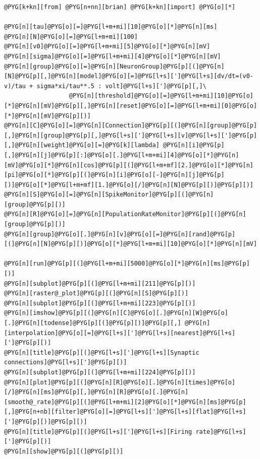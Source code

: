 \documentclass[letterpaper,10pt,english]{manual}
\begin{document}
\begin{Verbatim}[commandchars=@\[\]]
@PYG[k+kn][from] @PYG[n+nn][brian] @PYG[k+kn][import] @PYG[o][*]

@PYG[n][tau]@PYG[o][=]@PYG[l+m+mi][10]@PYG[o][*]@PYG[n][ms]
@PYG[n][N]@PYG[o][=]@PYG[l+m+mi][100]
@PYG[n][v0]@PYG[o][=]@PYG[l+m+mi][5]@PYG[o][*]@PYG[n][mV]
@PYG[n][sigma]@PYG[o][=]@PYG[l+m+mi][4]@PYG[o][*]@PYG[n][mV]
@PYG[n][group]@PYG[o][=]@PYG[n][NeuronGroup]@PYG[p][(]@PYG[n][N]@PYG[p][,]@PYG[n][model]@PYG[o][=]@PYG[l+s][']@PYG[l+s][dv/dt=(v0-v)/tau + sigma*xi/tau**.5 : volt]@PYG[l+s][']@PYG[p][,]\
                  @PYG[n][threshold]@PYG[o][=]@PYG[l+m+mi][10]@PYG[o][*]@PYG[n][mV]@PYG[p][,]@PYG[n][reset]@PYG[o][=]@PYG[l+m+mi][0]@PYG[o][*]@PYG[n][mV]@PYG[p][)]
@PYG[n][C]@PYG[o][=]@PYG[n][Connection]@PYG[p][(]@PYG[n][group]@PYG[p][,]@PYG[n][group]@PYG[p][,]@PYG[l+s][']@PYG[l+s][v]@PYG[l+s][']@PYG[p][,]@PYG[n][weight]@PYG[o][=]@PYG[k][lambda] @PYG[n][i]@PYG[p][,]@PYG[n][j]@PYG[p][:]@PYG[o][.]@PYG[l+m+mi][4]@PYG[o][*]@PYG[n][mV]@PYG[o][*]@PYG[n][cos]@PYG[p][(]@PYG[l+m+mf][2.]@PYG[o][*]@PYG[n][pi]@PYG[o][*]@PYG[p][(]@PYG[n][i]@PYG[o][-]@PYG[n][j]@PYG[p][)]@PYG[o][*]@PYG[l+m+mf][1.]@PYG[o][/]@PYG[n][N]@PYG[p][)]@PYG[p][)]
@PYG[n][S]@PYG[o][=]@PYG[n][SpikeMonitor]@PYG[p][(]@PYG[n][group]@PYG[p][)]
@PYG[n][R]@PYG[o][=]@PYG[n][PopulationRateMonitor]@PYG[p][(]@PYG[n][group]@PYG[p][)]
@PYG[n][group]@PYG[o][.]@PYG[n][v]@PYG[o][=]@PYG[n][rand]@PYG[p][(]@PYG[n][N]@PYG[p][)]@PYG[o][*]@PYG[l+m+mi][10]@PYG[o][*]@PYG[n][mV]

@PYG[n][run]@PYG[p][(]@PYG[l+m+mi][5000]@PYG[o][*]@PYG[n][ms]@PYG[p][)]
@PYG[n][subplot]@PYG[p][(]@PYG[l+m+mi][211]@PYG[p][)]
@PYG[n][raster@_plot]@PYG[p][(]@PYG[n][S]@PYG[p][)]
@PYG[n][subplot]@PYG[p][(]@PYG[l+m+mi][223]@PYG[p][)]
@PYG[n][imshow]@PYG[p][(]@PYG[n][C]@PYG[o][.]@PYG[n][W]@PYG[o][.]@PYG[n][todense]@PYG[p][(]@PYG[p][)]@PYG[p][,] @PYG[n][interpolation]@PYG[o][=]@PYG[l+s][']@PYG[l+s][nearest]@PYG[l+s][']@PYG[p][)]
@PYG[n][title]@PYG[p][(]@PYG[l+s][']@PYG[l+s][Synaptic connections]@PYG[l+s][']@PYG[p][)]
@PYG[n][subplot]@PYG[p][(]@PYG[l+m+mi][224]@PYG[p][)]
@PYG[n][plot]@PYG[p][(]@PYG[n][R]@PYG[o][.]@PYG[n][times]@PYG[o][/]@PYG[n][ms]@PYG[p][,]@PYG[n][R]@PYG[o][.]@PYG[n][smooth@_rate]@PYG[p][(]@PYG[l+m+mi][2]@PYG[o][*]@PYG[n][ms]@PYG[p][,]@PYG[n+nb][filter]@PYG[o][=]@PYG[l+s][']@PYG[l+s][flat]@PYG[l+s][']@PYG[p][)]@PYG[p][)]
@PYG[n][title]@PYG[p][(]@PYG[l+s][']@PYG[l+s][Firing rate]@PYG[l+s][']@PYG[p][)]
@PYG[n][show]@PYG[p][(]@PYG[p][)]
\end{Verbatim}
\end{document}
